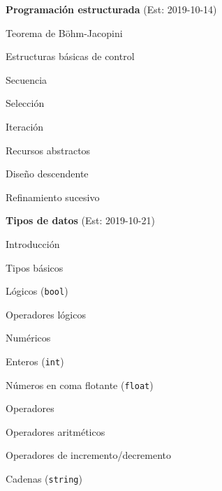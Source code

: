 \begin{longenum}
\begin{longenum}
    \end{longenum}
    \item \textbf{Programación estructurada}  (Est: 2019-10-14)
    \begin{longenum}
        \item Teorema de Böhm-Jacopini
        \item Estructuras básicas de control
        \begin{longenum}
            \item Secuencia
            \item Selección
            \item Iteración
        \end{longenum}
        \item Recursos abstractos
        \item Diseño descendente
        \item Refinamiento sucesivo
    \end{longenum}
    \item \textbf{Tipos de datos}  (Est: 2019-10-21)
    \begin{longenum}
        \item Introducción
        \item Tipos básicos
        \begin{longenum}
            \item Lógicos (\texttt{bool})
            \begin{longenum}
                \item Operadores lógicos
            \end{longenum}
            \item Numéricos
            \begin{longenum}
                \item Enteros (\texttt{int})
                \item Números en coma flotante (\texttt{float})
                \item Operadores
                \begin{longenum}
                    \item Operadores aritméticos
                    \item Operadores de incremento/decremento
                \end{longenum}
            \end{longenum}
            \item Cadenas (\texttt{string})
            \begin{longenum}

\end{longenum}
\end{longenum}
\end{longenum}
\end{longenum}
